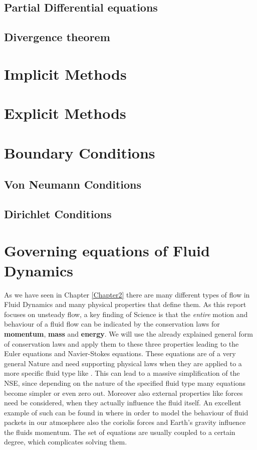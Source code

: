 \subsection{Partial Differential equations}

\subsection{Divergence theorem}
\label{sec:div_theorem}

\section{Implicit Methods}
\section{Explicit Methods}

\section{Boundary Conditions}
\subsection{Von Neumann Conditions}
\subsection{Dirichlet Conditions}

\section{Governing equations of Fluid Dynamics}
\label{sec:gov_eq_fluiddy}

As we have seen in Chapter \ref{Chapter2} there are many different types of flow in Fluid Dynamics and many physical properties that define them. As this report focuses on unsteady flow, a key finding of Science is that the \emph{entire} motion and behaviour of a fluid flow can be indicated by the conservation laws for \textbf{momentum}, \textbf{mass} and \textbf{energy}. We will use the already explained general form of conservation laws and apply them to these three properties leading to the Euler equations and Navier-Stokes equations. These equations are of a very general Nature and need supporting physical laws when they are applied to a more specific fluid type like . This can lead to a massive simplification of the NSE, since depending on the nature of the specified fluid type many equations become simpler or even zero out. Moreover also external properties like forces need be considered, when they actually influence the fluid itself. An excellent example of such can be found in \citep{Warner2010} where in order to model the behaviour of fluid packets in our atmosphere also the coriolis forces and Earth's gravity influence the fluids momentum. The set of equations are usually coupled to a certain degree, which complicates solving them. 

